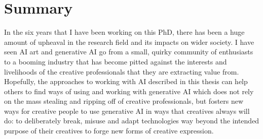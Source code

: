 \section{Summary}

In the six years that I have been working on this PhD, there has been a huge amount of upheaval in the research field and its impacts on wider society. 
I have seen AI art and generative AI go from a small, quirky community of enthusiasts to a booming industry that has become pitted against the interests and livelihoods of the creative professionals that they are extracting value from.
Hopefully, the approaches to working with AI described in this thesis can help others to find ways of using and working with generative AI which does not rely on the mass stealing and ripping off of creative professionals, but fosters new ways for creative people to use generative AI in ways that creatives always will do: to deliberately break, misuse and adapt technologies way beyond the intended purpose of their creatives to forge new forms of creative expression. 
